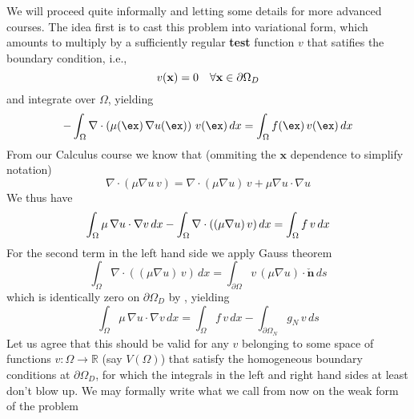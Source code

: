 We will proceed quite informally and letting some details for more advanced courses.
The idea first is to cast this problem into
variational form, which amounts to multiply by a sufficiently regular
\textbf{test} function $v$ that satifies the boundary condition, i.e.,
\begin{equation}
v(\mathbf{x}) = 0~~~\forall \mathbf{x} \in \partial{\Omega}_D \labeq{vzeroG}
\end{equation}
and integrate over $\Omega$, yielding
\begin{equation}
-\int_{\Omega}{\nabla\cdot \left ( \mu(\ex)\,\nabla{u}(\ex)\right ) \, {v}(\ex)}\,dx =
\int_{\Omega}{f(\ex)\,v(\ex)}\,dx \labeq{poissonbasicfv}
\end{equation}
From our Calculus course we know that (ommiting the $\mathbf{x}$ dependence to simplify notation)
\begin{equation}
\nabla \cdot \left(  \mu \nabla{u} \, v  \right) = \nabla \cdot \left(  \mu \nabla{u}  \right)\, v
+ \mu \nabla{u} \cdot \nabla{u} \nonumber
\end{equation}
We thus have
\begin{equation}
\int_{\Omega}{\mu\,\nabla{u}\cdot \nabla{v} }\,dx -\int_{\Omega}{\nabla \cdot \left(  (\mu \nabla{u}) \, v  \right)}\,dx  = 
\int_{\Omega}{f\,v}\,dx \labeq{poissonbasicfvfin}
\end{equation}
For the second term in the left hand side we apply Gauss theorem
\begin{equation}
\int_{\Omega}{\nabla \cdot \left(  (\mu \nabla{u}) \, v  \right)}\,dx  = \int_{\partial{\Omega}}{v\,(\mu \nabla{u})\cdot \check{\mathbf{n}}}\,ds
\end{equation}
which is identically zero on $\partial{\Omega}_D$ by , yielding
\begin{equation}
\int_{\Omega}{\mu\,\nabla{u}\cdot \nabla{v} }\,dx = \int_{\Omega}{f\,v}\,dx - \int_{\partial{\Omega}_N}{g_N \, v}\,ds
\end{equation}
Let us agree that this should be valid for any $v$ belonging to some space of
functions $v: \Omega \rightarrow \mathbb{R}$ (say $V(\Omega)$) that satisfy
the homogeneous boundary conditions at $\partial{\Omega}_D$, for which the integrals
in the left and right hand sides at least don't blow up.
We may formally write what we call from now on the weak form of the problem
